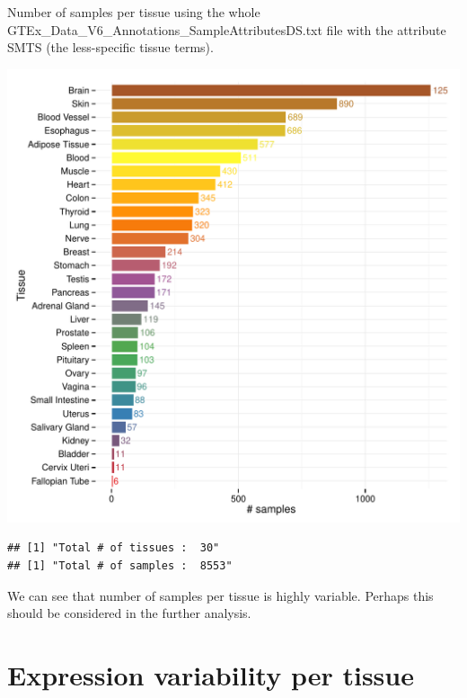 \documentclass{article}\usepackage[]{graphicx}\usepackage[]{color}
\makeatletter
\def\maxwidth{ %
  \ifdim\Gin@nat@width>\linewidth
    \linewidth
  \else
    \Gin@nat@width
  \fi
}
\newenvironment{kframe}{%
 \def\at@end@of@kframe{}%
 \ifinner\ifhmode%
  \def\at@end@of@kframe{\end{minipage}}%
  \begin{minipage}{\columnwidth}%
 \fi\fi%
 \def\FrameCommand##1{\hskip\@totalleftmargin \hskip-\fboxsep
 \colorbox{shadecolor}{##1}\hskip-\fboxsep
     \hskip-\linewidth \hskip-\@totalleftmargin \hskip\columnwidth}%
 \MakeFramed {\advance\hsize-\width
   \@totalleftmargin\z@ \linewidth\hsize
   \@setminipage}}%
 {\par\unskip\endMakeFramed%
 \at@end@of@kframe}
\newenvironment{knitrout}{}{} %
\makeatother
\begin{document}
Number of samples per tissue using the whole GTEx\_Data\_V6\_Annotations\_SampleAttributesDS.txt
file with the attribute SMTS (the less-specific tissue terms).

\begin{knitrout}
\color{fgcolor}
\includegraphics[width=\maxwidth]{figure/samples_per_tissue-1} 
\begin{kframe}\begin{verbatim}
## [1] "Total # of tissues :  30"
## [1] "Total # of samples :  8553"
\end{verbatim}
\end{kframe}
\end{knitrout}

We can see that number of samples per tissue is highly variable. Perhaps this should be considered in the further analysis.

\section{Expression variability per tissue}
\end{document}

